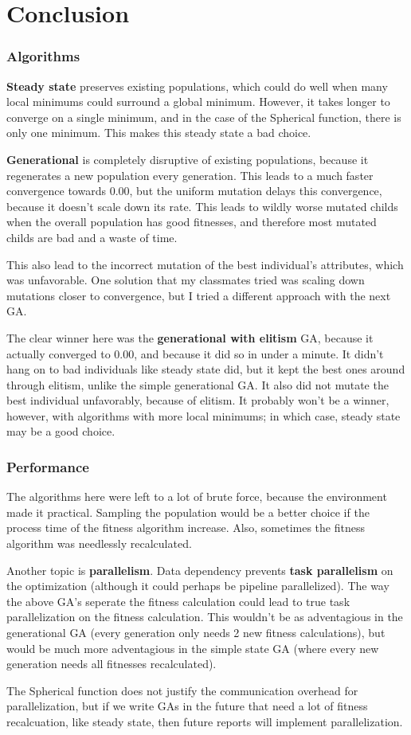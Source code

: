 \documentclass[12pt]{article}
\begin{document}
\part{Conclusion}
\section{Algorithms}
\textbf{Steady state} preserves existing populations, which could do well when many local minimums could surround a global minimum. However, it takes longer to converge on a single minimum, and in the case of the Spherical function, there is only one minimum. This makes this steady state a bad choice.

\textbf{Generational} is completely disruptive of existing populations, because it regenerates a new population every generation. This leads to a much faster convergence towards 0.00, but the uniform mutation delays this convergence, because it doesn't scale down its rate. This leads to wildly worse mutated childs when the overall population has good fitnesses, and therefore most mutated childs are bad and a waste of time. 

This also lead to the incorrect mutation of the best individual's attributes, which was unfavorable. One solution that my classmates tried was scaling down mutations closer to convergence, but I tried a different approach with the next GA.

The clear winner here was the \textbf{generational with elitism} GA, because it actually converged to 0.00, and because it did so in under a minute. It didn't hang on to bad individuals like steady state did, but it kept the best ones around through elitism, unlike the simple generational GA. It also did not mutate the best individual unfavorably, because of elitism. It probably won't be a winner, however, with algorithms with more local minimums; in which case, steady state may be a good choice.

\section{Performance}
The algorithms here were left to a lot of brute force, because the environment made it practical. Sampling the population would be a better choice if the process time of the fitness algorithm increase. Also, sometimes the fitness algorithm was needlessly recalculated. 

Another topic is \textbf{parallelism}. Data dependency prevents \textbf{task parallelism} on the optimization (although it could perhaps be pipeline parallelized). The way the above GA's seperate the fitness calculation could lead to true task parallelization on the fitness calculation. This wouldn't be as adventagious in the generational GA (every generation only needs 2 new fitness calculations), but would be much more adventagious in the simple state GA (where every new generation needs all fitnesses recalculated). 

The Spherical function does not justify the communication overhead for parallelization, but if we write GAs in the future that need a lot of fitness recalcuation, like steady state, then future reports will implement parallelization. 
\end{document}
